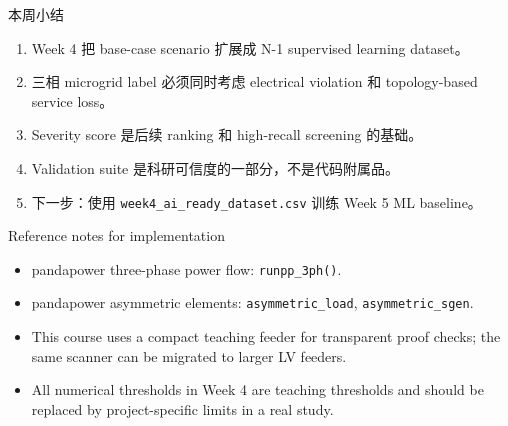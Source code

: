 \documentclass[aspectratio=169,11pt]{beamer}
\begin{document}
\begin{frame}{本周小结}
\begin{enumerate}
  \item Week 4 把 base-case scenario 扩展成 N-1 supervised learning dataset。
  \item 三相 microgrid label 必须同时考虑 electrical violation 和 topology-based service loss。
  \item Severity score 是后续 ranking 和 high-recall screening 的基础。
  \item Validation suite 是科研可信度的一部分，不是代码附属品。
  \item 下一步：使用 \texttt{week4\_ai\_ready\_dataset.csv} 训练 Week 5 ML baseline。
\end{enumerate}
\end{frame}

\begin{frame}{Reference notes for implementation}
\small
\begin{itemize}
  \item pandapower three-phase power flow: \texttt{runpp\_3ph()}.
  \item pandapower asymmetric elements: \texttt{asymmetric\_load}, \texttt{asymmetric\_sgen}.
  \item This course uses a compact teaching feeder for transparent proof checks; the same scanner can be migrated to larger LV feeders.
  \item All numerical thresholds in Week 4 are teaching thresholds and should be replaced by project-specific limits in a real study.
\end{itemize}
\end{frame}
\end{document}
